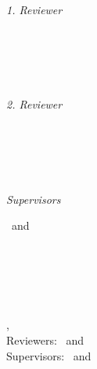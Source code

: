 \begin{titlepage}
	\vfill
	\begin{minipage}[t]{.27\textwidth}
		\raggedleft
		\textit{1. Reviewer}
	\end{minipage}
	\hspace*{15pt}
	\begin{minipage}[t]{.65\textwidth}
		{\Large \thesisFirstReviewer} \\
		{\small \thesisFirstReviewerDepartment} \\[-1mm]
		{\small \thesisFirstReviewerUniversity}
	\end{minipage} \\[5mm]
	\begin{minipage}[t]{.27\textwidth}
		\raggedleft
		\textit{2. Reviewer}
	\end{minipage}
	\hspace*{15pt}
	\begin{minipage}[t]{.65\textwidth}
		{\Large \thesisSecondReviewer} \\
		{\small \thesisSecondReviewerDepartment} \\[-1mm]
		{\small \thesisSecondReviewerUniversity}
	\end{minipage} \\[10mm]
	\begin{minipage}[t]{.27\textwidth}
		\raggedleft
		\textit{Supervisors}
	\end{minipage}
	\hspace*{15pt}
	\begin{minipage}[t]{.65\textwidth}
		\thesisFirstSupervisor\ and \thesisSecondSupervisor
	\end{minipage} \\[10mm]

	\thesisDate \\

\end{titlepage}


\hfill
\vfill
{
	\small
	\textbf{\thesisName} \\
	\textit{\thesisTitle} \\
	\thesisSubject, \thesisDate \\
	Reviewers: \thesisFirstReviewer\ and \thesisSecondReviewer \\
	Supervisors: \thesisFirstSupervisor\ and \thesisSecondSupervisor \\[1.5em]
	\textbf{\thesisUniversity} \\
	\textit{\thesisUniversityGroup} \\
	\thesisUniversityInstitute \\
	\thesisUniversityDepartment \\
	\thesisUniversityStreetAddress \\
	\thesisUniversityPostalCode\ \thesisUniversityCity
}

